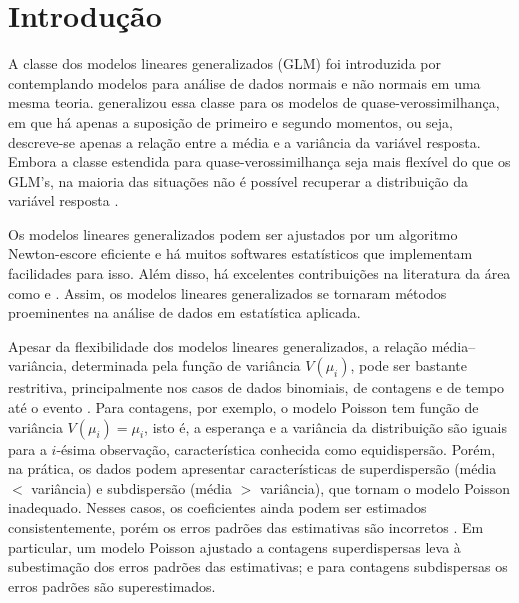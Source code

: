 \documentclass[
    oldfontcommands,
    11pt,
    openright,
    twoside,
    a4paper,
    english,
    brazil
]{abntex2}\usepackage[]{graphicx}\usepackage[]{color}
\begin{document}


\imprimircapa
\imprimirfolhaderosto


\tableofcontents*
\cleardoublepage





\textual

\chapter{Introdução}
\label{cha:introducao}

A classe dos modelos lineares generalizados (GLM) foi introduzida por
\citet{Nelder1972} contemplando modelos para análise de dados normais e
não normais em uma mesma teoria. \citet{Wedderburn1974} generalizou essa
classe para os modelos de quase-verossimilhança, em que há apenas a
suposição de primeiro e segundo momentos, ou seja, descreve-se apenas a
relação entre a média e a variância da variável resposta. Embora a
classe estendida para quase-verossimilhança seja mais flexível do que os
GLM's, na maioria das situações não é possível recuperar a distribuição
da variável resposta \citep{Paula2013}.

Os modelos lineares generalizados podem ser ajustados por um algoritmo
Newton-escore eficiente e há muitos softwares estatísticos que
implementam facilidades para isso. Além disso, há excelentes
contribuições na literatura da área como \citet{McCullagh1989,
  Venables2002} e \citet{Dobson2008}. Assim, os modelos lineares
generalizados se tornaram métodos proeminentes na análise de dados em
estatística aplicada.

Apesar da flexibilidade dos modelos lineares generalizados, a relação
média--variância, determinada pela função de variância $V(\mu_i)$, pode
ser bastante restritiva, principalmente nos casos de dados binomiais, de
contagens e de tempo até o evento \citep{Molenberghs2010,
  Molenberghs2017}. Para contagens, por exemplo, o modelo Poisson tem
função de variância $V(\mu_i) = \mu_i$, isto é, a esperança e a
variância da distribuição são iguais para a $i$-ésima observação,
característica conhecida como equidispersão. Porém, na prática, os dados
podem apresentar características de superdispersão (média $<$ variância)
e subdispersão (média $>$ variância), que tornam o modelo Poisson
inadequado. Nesses casos, os coeficientes ainda podem ser estimados
consistentemente, porém os erros padrões das estimativas são incorretos
\citep{Winkelmann1994, Hinde1998}. Em particular, um modelo Poisson
ajustado a contagens superdispersas leva à subestimação dos erros
padrões das estimativas; e para contagens subdispersas os erros padrões
são superestimados.
\end{document}
